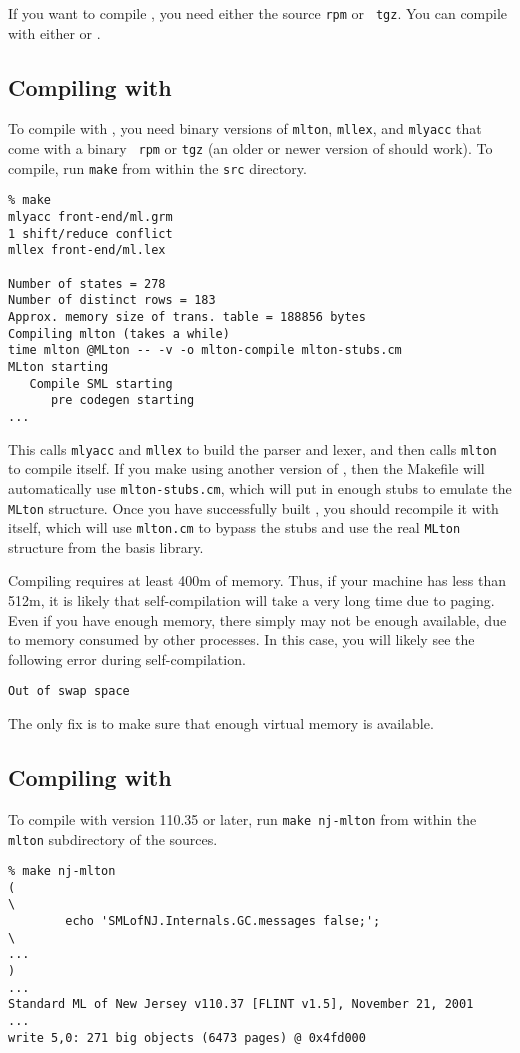 
If you want to compile {\mlton}, you need either the source {\tt rpm} or {\tt
tgz}.  You can compile with either {\mlton} or {\smlnj}.

\subsection{Compiling with {\mlton}}

To compile with {\mlton}, you need binary versions of {\tt mlton},
{\tt mllex}, and {\tt mlyacc} that come with a {\mlton} binary {\tt
rpm} or {\tt tgz} (an older or newer version of {\mlton} should work).
To compile, run {\tt make} from within the {\tt src} directory.
\begin{verbatim}
% make
mlyacc front-end/ml.grm
1 shift/reduce conflict
mllex front-end/ml.lex

Number of states = 278
Number of distinct rows = 183
Approx. memory size of trans. table = 188856 bytes
Compiling mlton (takes a while)
time mlton @MLton -- -v -o mlton-compile mlton-stubs.cm
MLton starting
   Compile SML starting
      pre codegen starting
...
\end{verbatim}
This calls {\tt mlyacc} and {\tt mllex} to build the parser and lexer, and then
calls {\tt mlton} to compile itself.  If you make {\mlton} using another version
of {\mlton}, then the Makefile will automatically use {\tt mlton-stubs.cm},
which will put in enough stubs to emulate the {\tt MLton} structure.  Once you
have successfully built {\mlton}, you should recompile it with itself, which
will use {\tt mlton.cm} to bypass the stubs and use the real {\tt MLton}
structure from the basis library.

Compiling {\mlton} requires at least 400m of memory.  Thus, if your machine has
less than 512m, it is likely that self-compilation will take a very long time
due to paging.  Even if you have enough memory, there simply may not be enough
available, due to memory consumed by other processes.  In this case, you will
likely see the following error during self-compilation.
\begin{verbatim}
Out of swap space
\end{verbatim}
The only fix is to make sure that enough virtual memory is available.

\subsection{Compiling with {\smlnj}}

To compile with {\smlnj} version 110.35 or later, run {\tt make nj-mlton} from
within the {\tt mlton} subdirectory of the sources.
\begin{verbatim}
% make nj-mlton
(                                                                       \
        echo 'SMLofNJ.Internals.GC.messages false;';                    \
...
)
...
Standard ML of New Jersey v110.37 [FLINT v1.5], November 21, 2001
...
write 5,0: 271 big objects (6473 pages) @ 0x4fd000
\end{verbatim}
